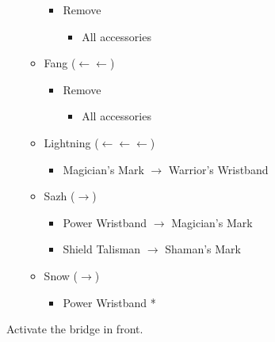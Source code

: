 \begin{paracol}{2}
\begin{menu}
\begin{itemize}
\begin{itemize}
\begin{itemize}
					      \item Remove
					            \begin{itemize}
						            \item All accessories
					            \end{itemize}
				      \end{itemize}
				\item Fang ($\leftarrow\leftarrow$)
				      \begin{itemize}
					      \item Remove
					            \begin{itemize}
						            \item All accessories
					            \end{itemize}
				      \end{itemize}
				\item Lightning ($\leftarrow\leftarrow\leftarrow$)
				      \begin{itemize}
					      \item Magician's Mark $\rightarrow$ Warrior's Wristband
				      \end{itemize}
				\item Sazh ($\rightarrow$)
				      \begin{itemize}
					      \item Power Wristband $\rightarrow$ Magician's Mark
					      \item Shield Talisman $\rightarrow$ Shaman's Mark
				      \end{itemize}
				\item Snow ($\rightarrow$)
				      \begin{itemize}
					      \item Power Wristband *
				      \end{itemize}
			\end{itemize}
		\end{itemize}
	\end{menu}

	\switchcolumn*
	\renewcommand{\first}{[1] Strike Team (\com/\syn/\com)}
	\renewcommand{\second}{[2] Tri-Disaster (\rav/\rav/\rav)}
	\renewcommand{\third}{[3] Tri-Disaster (\rav/\rav/\rav)}
	\renewcommand{\fourth}{[4] Cerberus (\com/\com/\com)}
	\renewcommand{\fifth}{[5] Cerberus (\com/\com/\com)}
	Activate the bridge in front.


\end{paracol}
